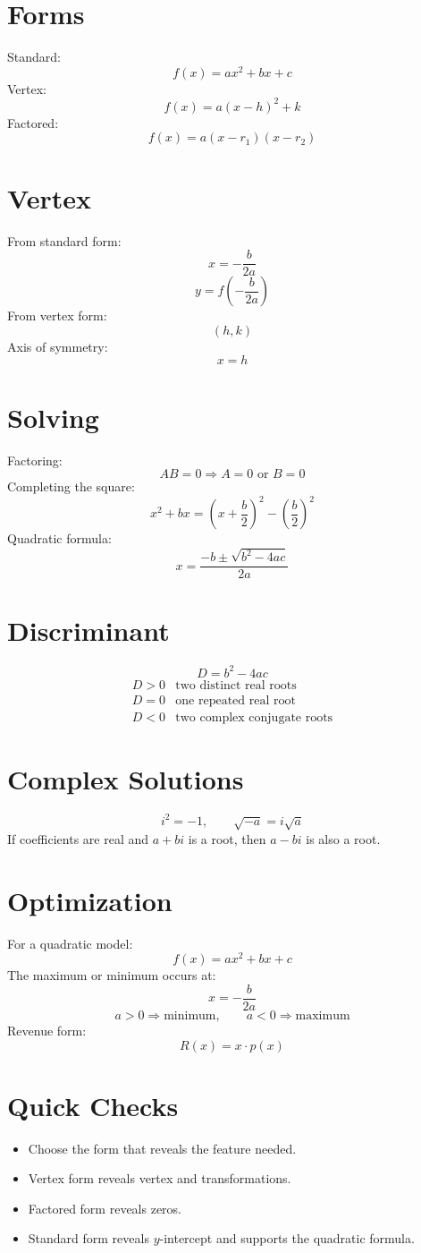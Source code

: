 \documentclass[11pt]{article}
\begin{document}

\section*{Forms}
Standard:
\[
f(x)=ax^2+bx+c
\]
Vertex:
\[
f(x)=a(x-h)^2+k
\]
Factored:
\[
f(x)=a(x-r_1)(x-r_2)
\]

\section*{Vertex}
From standard form:
\[
x=-\frac{b}{2a}
\]
\[
y=f\left(-\frac{b}{2a}\right)
\]
From vertex form:
\[
(h,k)
\]
Axis of symmetry:
\[
x=h
\]

\section*{Solving}
Factoring:
\[
AB=0\Rightarrow A=0\text{ or }B=0
\]
Completing the square:
\[
x^2+bx=\left(x+\frac b2\right)^2-\left(\frac b2\right)^2
\]
Quadratic formula:
\[
x=\frac{-b\pm\sqrt{b^2-4ac}}{2a}
\]

\section*{Discriminant}
\[
D=b^2-4ac
\]
\[
\begin{array}{ll}
D>0 & \text{two distinct real roots}\\
D=0 & \text{one repeated real root}\\
D<0 & \text{two complex conjugate roots}
\end{array}
\]

\section*{Complex Solutions}
\[
i^2=-1,\qquad \sqrt{-a}=i\sqrt a
\]
If coefficients are real and $a+bi$ is a root, then $a-bi$ is also a root.

\section*{Optimization}
For a quadratic model:
\[
f(x)=ax^2+bx+c
\]
The maximum or minimum occurs at:
\[
x=-\frac{b}{2a}
\]
\[
a>0\Rightarrow \text{minimum},\qquad a<0\Rightarrow \text{maximum}
\]
Revenue form:
\[
R(x)=x\cdot p(x)
\]

\section*{Quick Checks}
\begin{itemize}
  \item Choose the form that reveals the feature needed.
  \item Vertex form reveals vertex and transformations.
  \item Factored form reveals zeros.
  \item Standard form reveals \(y\)-intercept and supports the quadratic formula.
\end{itemize}
\end{document}
